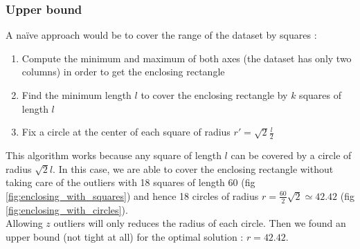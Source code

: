 \documentclass[a4paper,11pt,openany]{article}
\begin{document}
\subsubsection*{Upper bound}
\noindent
A naïve approach would be to cover the range of the dataset by squares :
\begin{enumerate}
\item Compute the minimum and maximum of both axes (the dataset has only two columns) in order to get the enclosing rectangle
\item Find the minimum length $l$ to cover the enclosing rectangle by $k$ squares of length $l$
\item Fix a circle at the center of each square of radius $r'=\sqrt{2}\frac{l}{2}$
\end{enumerate}
This algorithm works because any square of length $l$ can be covered by a circle of radius $\sqrt{2}l$. In this case, we are able to cover the enclosing rectangle without taking care of the outliers with 18 squares of length 60 (fig \ref{fig:enclosing_with_squares}) and hence 18 circles of radius $r=\frac{60}{2}\sqrt{2}\simeq 42.42$ (fig \ref{fig:enclosing_with_circles}).\\
Allowing $z$ outliers will only reduces the radius of each circle. Then we found an upper bound (not tight at all) for the optimal solution : $r=42.42$.
\end{document}

